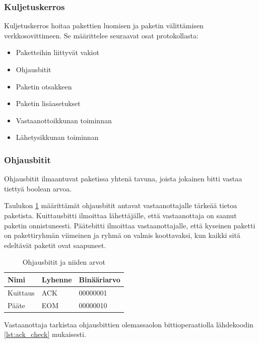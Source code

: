 \documentclass[a4paper,12pt]{article}
\begin{document}
\newpage

    \subsubsection{Kuljetuskerros}\label{subsec:kuljetuskerros}
    Kuljetuskerros hoitaa pakettien luomisen ja paketin välittämisen verkkosovittimeen.
    Se määrittelee seuraavat osat protokollasta:

    \begin{itemize}
        \item Paketteihin liittyvät vakiot
        \item Ohjausbitit
        \item Paketin otsakkeen
        \item Paketin lisäasetukset
        \item Vastaanottoikkunan toiminnan
        \item Lähetysikkunan toiminnan
    \end{itemize}

    \subsubsection{Ohjausbitit}\label{subsec:control_bits}
    Ohjausbitit ilmaantuvat paketissa yhtenä tavuna, joista jokainen bitti vastaa tiettyä boolean arvoa.

    Taulukon \ref{tab:control_bits} määrittämät ohjausbitit antavat vastaanottajalle tärkeää tietoa paketista. Kuittausbitti ilmoittaa lähettäjälle, että vastaanottaja on saanut paketin onnistuneesti. Päätebitti ilmoittaa vastaanottajalle, että kyseinen paketti on pakettiryhmän viimeinen ja ryhmä on valmis koottavaksi, kun kaikki sitä edeltävät paketit ovat saapuneet. \par
    
    \begin{table}[h!]
        \centering
        \begin{tabular}{lll}
            Nimi     & Lyhenne & Binääriarvo \\
            \hline
            Kuittaus & ACK     & 00000001    \\
            Pääte    & EOM     & 00000010    \\
        \end{tabular}
        \caption{Ohjausbitit ja niiden arvot}
        \label{tab:control_bits}
    \end{table}


    Vastaanottaja tarkistaa ohjausbittien olemassaolon bittioperaatiolla lähdekoodin \ref{lst:ack_check} mukaisesti.
\newpage
    
\end{document}

